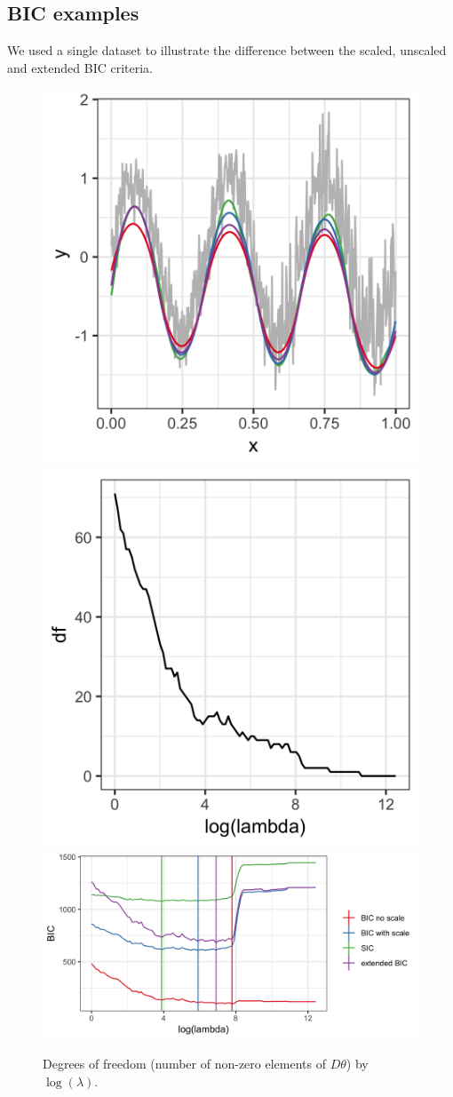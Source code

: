 \documentclass[]{article}
\begin{document}
\subsection*{BIC examples}

We used a single dataset to illustrate the difference between the scaled, unscaled and extended BIC criteria. 

\begin{figure}[h!]
	\caption{Degrees of freedom (number of non-zero elements of $D\theta$) by $\log(\lambda)$.} 
	\includegraphics[width = 0.25\linewidth]{Figures/BIC_data.png}
	\includegraphics[width = 0.25\linewidth]{Figures/df_by_lambda.png}
	\includegraphics[width = 0.5\linewidth]{Figures/BIC_by_lambda.png}
\end{figure}
\end{document}
